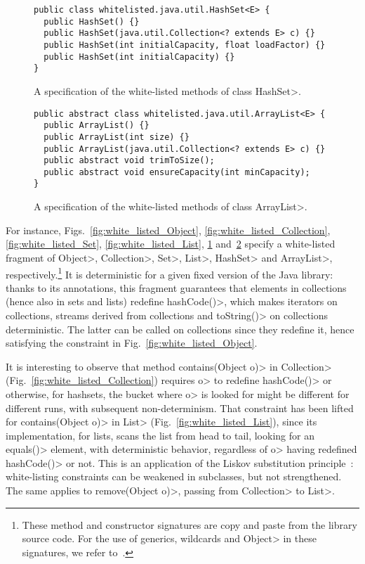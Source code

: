 \begin{figure}
\begin{verbatim}
public class whitelisted.java.util.HashSet<E> {
  public HashSet() {}
  public HashSet(java.util.Collection<? extends E> c) {}
  public HashSet(int initialCapacity, float loadFactor) {}
  public HashSet(int initialCapacity) {}
}
\end{verbatim}
\caption{A specification of the white-listed methods of class \<HashSet>.}
\label{fig:white_listed_HashSet}
\end{figure}

\begin{figure}
\begin{verbatim}
public abstract class whitelisted.java.util.ArrayList<E> {
  public ArrayList() {}
  public ArrayList(int size) {}
  public ArrayList(java.util.Collection<? extends E> c) {}
  public abstract void trimToSize();
  public abstract void ensureCapacity(int minCapacity);
}
\end{verbatim}
\caption{A specification of the white-listed methods of class \<ArrayList>.}
\label{fig:white_listed_ArrayList}
\end{figure}

For instance, Figs.~\ref{fig:white_listed_Object}, \ref{fig:white_listed_Collection},
\ref{fig:white_listed_Set}, \ref{fig:white_listed_List},
\ref{fig:white_listed_HashSet} and~\ref{fig:white_listed_ArrayList}
specify a white-listed fragment of \<Object>,
\<Collection>, \<Set>, \<List>, \<HashSet> and \<ArrayList>,
respectively.\footnote{These method and constructor signatures are copy and paste from the
library source code. For the use of generics, wildcards and
\<Object> in these signatures, we refer to~\cite{NaftalinW06}.}
It is deterministic for a given fixed version of the Java library:
thanks to its annotations, this fragment guarantees that elements in collections
(hence also in sets and lists) redefine \<hashCode()>, which makes iterators
on collections, streams derived from collections and \<toString()> on collections
deterministic. The latter can be called on collections since they redefine it,
hence satisfying the constraint in Fig.~\ref{fig:white_listed_Object}.

It is interesting to observe that method
\<contains(Object o)> in \<Collection> (Fig.~\ref{fig:white_listed_Collection})
requires \<o> to redefine \<hashCode()>
or otherwise, for hashsets, the bucket where \<o> is looked for might be different
for different runs, with subsequent non-determinism.
That constraint has been lifted for \<contains(Object o)> in \<List>
(Fig.~\ref{fig:white_listed_List}), since its implementation, for lists,
scans the list from head to tail,
looking for an \<equals()> element, with deterministic behavior,
regardless of \<o> having redefined \<hashCode()> or not. This is an application
of the Liskov substitution principle~\cite{LiskovW94}:
white-listing constraints can be weakened in subclasses,
but not strengthened. The same applies to \<remove(Object o)>, passing from
\<Collection> to \<List>.

